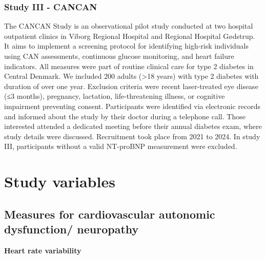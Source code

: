 \documentclass[
  a4paper,
  headsepline=true,
  open=any]{scrbook}
\begin{document}
\hypertarget{study-iii---cancan}{%
\subsubsection{Study III - CANCAN}\label{study-iii---cancan}}

The CANCAN Study is an observational pilot study conducted at two
hospital outpatient clinics in Viborg Regional Hospital and Regional
Hospital Gødstrup. It aims to implement a screening protocol for
identifying high-risk individuals using CAN assessments, continuous
glucose monitoring, and heart failure indicators. All measures were part
of routine clinical care for type 2 diabetes in Central Denmark. We
included 200 adults (\textgreater18 years) with type 2 diabetes with
duration of over one year. Exclusion criteria were recent laser-treated
eye disease (≤3 months), pregnancy, lactation, life-threatening illness,
or cognitive impairment preventing consent. Participants were identified
via electronic records and informed about the study by their doctor
during a telephone call. Those interested attended a dedicated meeting
before their annual diabetes exam, where study details were discussed.
Recruitment took place from 2021 to 2024. In study III, participants
without a valid NT-proBNP measurement were excluded.

\hypertarget{study-variables}{%
\section{Study variables}\label{study-variables}}

\hypertarget{measures-for-cardiovascular-autonomic-dysfunction-neuropathy}{%
\subsection{Measures for cardiovascular autonomic dysfunction/
neuropathy}\label{measures-for-cardiovascular-autonomic-dysfunction-neuropathy}}

\textbf{Heart rate variability}
\end{document}
